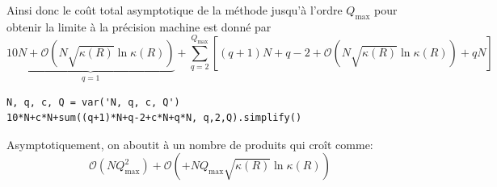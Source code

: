 \documentclass[svgnames,dvipsnames,a4paper,10pt,french]{report}
\begin{document}
\begin{itemize}
   
    
    
    
\end{itemize}

 

Ainsi donc le coût total asymptotique de la méthode jusqu'à l'ordre $Q_\text{max}$ pour obtenir la limite à la précision machine est donné par 
\begin{equation}
    \underbrace{10N+\mathcal{O}\left(N\sqrt{\kappa(R)} \ln \kappa (R)\right)}_{q=1} + \sum_{q=2}^{Q_\text{max}} \left[(q+1)N+q-2 +\mathcal{O}\left(N\sqrt{\kappa(R)} \ln \kappa (R)\right) +qN \right]
\end{equation}

\begin{verbatim}
N, q, c, Q = var('N, q, c, Q')
10*N+c*N+sum((q+1)*N+q-2+c*N+q*N, q,2,Q).simplify()
\end{verbatim}



Asymptotiquement, on aboutit à un nombre de produits qui croît comme:
\begin{equation}
    \boxed{\mathcal{O}(NQ_\text{max}^2)+\mathcal{O}\left(+NQ_\text{max}\sqrt{\kappa(R)} \ln \kappa(R) \right) }
\end{equation}
\end{document}
